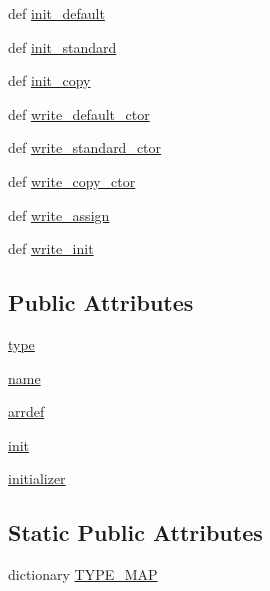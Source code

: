 \begin{DoxyCompactItemize}
\item 
def \hyperlink{classpanda_1_1branch_1_1Branch_aa3f076a42652088d9ef97894efd23757}{init\_\-default}
\item 
def \hyperlink{classpanda_1_1branch_1_1Branch_a954282a0978ece2630a8e5e157e4f157}{init\_\-standard}
\item 
def \hyperlink{classpanda_1_1branch_1_1Branch_ad9e2f082c14fcc478088c3be379ce475}{init\_\-copy}
\item 
def \hyperlink{classpanda_1_1branch_1_1Branch_ad4467f85647bbd2fcb9f7f7e45dbb1e5}{write\_\-default\_\-ctor}
\item 
def \hyperlink{classpanda_1_1branch_1_1Branch_adbce0fecb941ff3c54175a36d747318f}{write\_\-standard\_\-ctor}
\item 
def \hyperlink{classpanda_1_1branch_1_1Branch_a7ef868a4f1a6163051308e3f4353f48f}{write\_\-copy\_\-ctor}
\item 
def \hyperlink{classpanda_1_1branch_1_1Branch_a4309415b4e0c852107dd53227864c6c0}{write\_\-assign}
\item 
def \hyperlink{classpanda_1_1branch_1_1Branch_a84762a0e9ebcac10bd421a1f1ab5edb1}{write\_\-init}
\end{DoxyCompactItemize}
\subsection*{Public Attributes}
\begin{DoxyCompactItemize}
\item 
\hyperlink{classpanda_1_1branch_1_1Branch_a7af3eb89029c8d8f1a0c649215ae6496}{type}
\item 
\hyperlink{classpanda_1_1branch_1_1Branch_a1a5bfd423921d0f94dbbafbb6922399f}{name}
\item 
\hyperlink{classpanda_1_1branch_1_1Branch_a60b0e0e21adbece494ea59773e47fa66}{arrdef}
\item 
\hyperlink{classpanda_1_1branch_1_1Branch_ac071412c30112055734e99a4e3939d9a}{init}
\item 
\hyperlink{classpanda_1_1branch_1_1Branch_ab21c2e370b20331cea672950a44a817a}{initializer}
\end{DoxyCompactItemize}
\subsection*{Static Public Attributes}
\begin{DoxyCompactItemize}
\item 
dictionary \hyperlink{classpanda_1_1branch_1_1Branch_a2d148907b0fce8793730bbe913bb6491}{TYPE\_\-MAP}
\end{DoxyCompactItemize}


